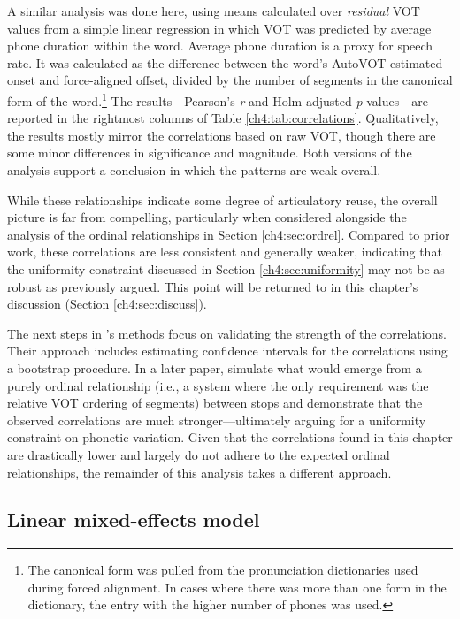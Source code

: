 A similar analysis was done here, using means calculated over \textit{residual} VOT values from a simple linear regression in which VOT was predicted by average phone duration within the word. Average phone duration is a proxy for speech rate. It was calculated as the difference between the word's AutoVOT-estimated onset and force-aligned offset, divided by the number of segments in the canonical form of the word.\footnote{The canonical form was pulled from the pronunciation dictionaries used during forced alignment. In cases where there was more than one form in the dictionary, the entry with the higher number of phones was used.\label{ch4:foot:canonical}} The results---Pearson's \textit{r} and Holm-adjusted \textit{p} values---are reported in the rightmost columns of Table \ref{ch4:tab:correlations}. Qualitatively, the results mostly mirror the correlations based on raw VOT, though there are some minor differences in significance and magnitude. Both versions of the analysis support a conclusion in which the patterns are weak overall.

While these relationships indicate some degree of articulatory reuse, the overall picture is far from compelling, particularly when considered alongside the analysis of the ordinal relationships in Section \ref{ch4:sec:ordrel}. Compared to prior work, these correlations are less consistent and generally weaker, indicating that the uniformity constraint discussed in Section \ref{ch4:sec:uniformity} may not be as robust as previously argued. This point will be returned to in this chapter's discussion (Section \ref{ch4:sec:discuss}).

The next steps in \citeauthor{chodroff_2017_structure}'s \citeyearpar{chodroff_2017_structure} methods focus on validating the strength of the correlations. Their approach includes estimating confidence intervals for the correlations using a bootstrap procedure. In a later paper, \citet{chodroff_2019_covariation} simulate what would emerge from a purely ordinal relationship (i.e., a system where the only requirement was the relative VOT ordering of segments) between stops and demonstrate that the observed correlations are much stronger---ultimately arguing for a uniformity constraint on phonetic variation. Given that the correlations found in this chapter are drastically lower and largely do not adhere to the expected ordinal relationships, the remainder of this analysis takes a different approach.

\subsection{Linear mixed-effects model}\label{ch4:sec:lmem}

